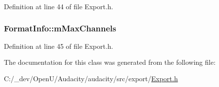 Definition at line 44 of file Export.\+h.

\subsubsection[{\texorpdfstring{m\+Max\+Channels}{mMaxChannels}}]{ Format\+Info\+::m\+Max\+Channels}\hypertarget{class_format_info_a007c961ea4b94091988f0472ada973e6}{}\label{class_format_info_a007c961ea4b94091988f0472ada973e6}


Definition at line 45 of file Export.\+h.



The documentation for this class was generated from the following file\+:\begin{DoxyCompactItemize}
\item 
C\+:/\+\_\+dev/\+Open\+U/\+Audacity/audacity/src/export/\hyperlink{src_2export_2export_8h}{Export.\+h}\end{DoxyCompactItemize}
